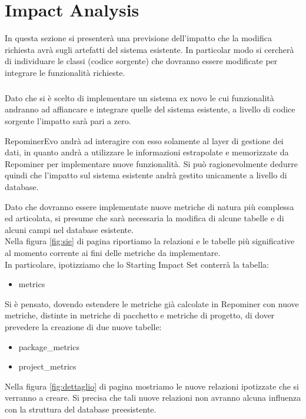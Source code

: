 \chapter{Impact Analysis}
In questa sezione si presenterà una previsione dell'impatto che la modifica richiesta avrà sugli artefatti del sistema esistente. In particolar modo si cercherà di individuare le classi (codice sorgente) che dovranno essere modificate per integrare le funzionalità richieste.

\paragraph{}
Dato che si è scelto di implementare un sistema ex novo le cui funzionalità andranno ad affiancare e integrare quelle del sistema esistente, a livello di codice sorgente l'impatto sarà pari a zero.

RepominerEvo andrà ad interagire con esso solamente al layer di gestione dei dati, in quanto andrà a utilizzare le informazioni estrapolate e memorizzate da Repominer per implementare nuove funzionalità. Si può ragionevolmente dedurre quindi che l'impatto sul sistema esistente andrà gestito unicamente a livello di database.

Dato che dovranno essere implementate nuove metriche di natura più complessa ed articolata, si presume che sarà necessaria la modifica di alcune tabelle e di alcuni campi nel database esistente.
\\

Nella figura \ref{fig:sie} di pagina \pageref{fig:sie} riportiamo la relazioni e le tabelle più significative al momento corrente ai fini delle metriche da implementare.
\\
In particolare, ipotizziamo che lo Starting Impact Set conterrà la tabella:
\begin{itemize}
\item metrics
\end{itemize}
Si è pensato, dovendo estendere le metriche già calcolate in Repominer con nuove metriche, distinte in metriche di pacchetto e metriche di progetto, di dover prevedere la creazione di due nuove tabelle: 
\begin{itemize}
\item package\_metrics
\item project\_metrics
\end{itemize}

Nella figura \ref{fig:dettaglio} di pagina \pageref{fig:dettaglio} mostriamo le nuove relazioni ipotizzate che si verranno a creare. Si precisa che tali nuove relazioni non avranno alcuna influenza con la struttura del database preesistente.

